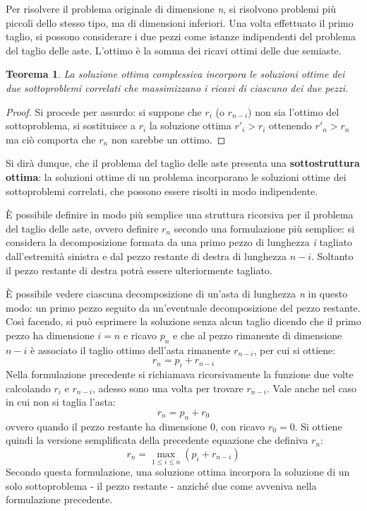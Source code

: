 \documentclass[10pt, a4paper]{report}
\newtheorem{theorem}{Teorema}[chapter]
\begin{document}
Per risolvere il problema originale di dimensione \textit{n}, si risolvono problemi più piccoli dello stesso tipo, ma di dimensioni inferiori. Una volta effettuato il primo taglio, si possono considerare i due pezzi come istanze indipendenti del problema del taglio delle aste. L'ottimo è la somma dei ricavi ottimi delle due semiaste.
\begin{theorem}
La soluzione ottima complessiva incorpora le soluzioni ottime dei due sottoproblemi correlati che massimizzano i ricavi di ciascuno dei due pezzi.
\end{theorem}
\begin{proof}
Si procede per assurdo: si suppone che $r_i$ (o $r_{n-i}$) non sia l'ottimo del sottoproblema, si sostituisce a $r_i$ la soluzione ottima $r'_i > r_i$ ottenendo $r'_n > r_n$ ma ciò comporta che $r_n$ non sarebbe un ottimo.
\end{proof}
Si dirà dunque, che il problema del taglio delle aste presenta una \textbf{sottostruttura ottima}: la soluzioni ottime di un problema incorporano le soluzioni ottime dei sottoproblemi correlati, che possono essere risolti in modo indipendente.

È possibile definire in modo più semplice una struttura ricorsiva per il problema del taglio delle aste, ovvero definire $r_n$ secondo una formulazione più semplice:  si considera la decomposizione formata da una primo pezzo di lunghezza \textit{i} tagliato dall'estremità sinistra e dal pezzo restante di destra di lunghezza $n - i$. Soltanto il pezzo restante di destra potrà essere ulteriormente tagliato.

È possibile vedere ciascuna decomposizione di un'asta di lunghezza \textit{n} in questo modo: un primo pezzo seguito da un'eventuale decomposizione del pezzo restante. Così facendo, si può esprimere la soluzione senza alcun taglio dicendo che il primo pezzo ha dimensione $i = n$ e ricavo $p_n$ e che al pezzo rimanente di dimensione $n - i$ è associato il taglio ottimo dell'asta rimanente $r_{n-i}$, per cui si ottiene:
\begin{equation*}
r_n = p_i + r_{n-i}
\end{equation*}
Nella formulazione precedente si richiamava ricorsivamente la funzione due volte calcolando $r_i$ e $r_{n-i}$, adesso sono una volta per trovare $r_{n-i}$. Vale anche nel caso in cui non si taglia l'asta:
\begin{equation*}
r_n = p_n + r_0
\end{equation*}
ovvero quando il pezzo restante ha dimensione 0, con ricavo $r_0 = 0$. Si ottiene quindi la versione semplificata della precedente equazione che definiva $r_n$:
\begin{equation*}
r_n = \max_{1 \leq i \leq n} (p_i + r_{n-i})
\end{equation*}
Secondo questa formulazione, una soluzione ottima incorpora la soluzione di un solo sottoproblema - il pezzo restante - anziché due come avveniva nella formulazione precedente.
\end{document}

